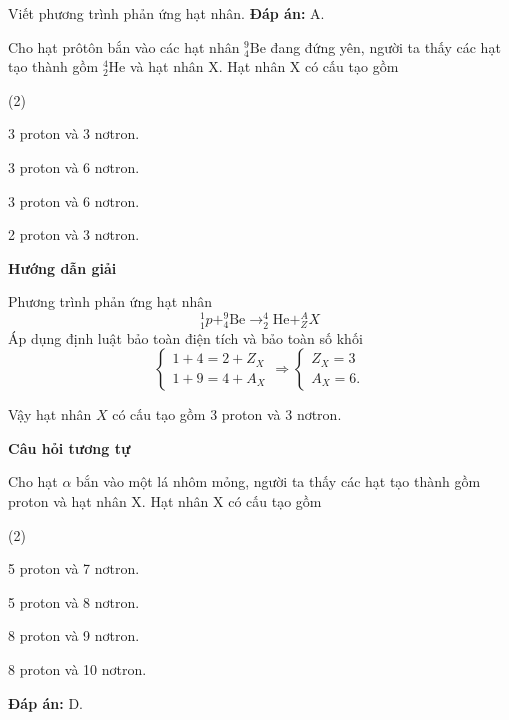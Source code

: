 \begin{dang}{Viết phương trình phản ứng hạt nhân.}
{\textbf{Đáp án:} A.
}
{Cho hạt prôtôn bắn vào các hạt nhân $^9_4\text{Be}$ đang đứng yên, người ta thấy các hạt tạo thành gồm $^4_2\text{He}$ và hạt nhân X. Hạt nhân X có cấu tạo gồm
	\begin{mcq}(2)
		\item 3 proton và 3 nơtron.
		\item 3 proton và 6 nơtron.
		\item 3 proton và 6 nơtron.
		\item 2 proton và 3 nơtron.
	\end{mcq}
}	{\begin{center}
		\textbf{Hướng dẫn giải}
	\end{center}
	Phương trình phản ứng hạt nhân
	\begin{equation*}
	^1_1 p+^9_4\text{Be}\rightarrow ^4_2\text{He}+^A_Z X
	\end{equation*}
	Áp dụng định luật bảo toàn điện tích và bảo toàn số khối
	\begin{equation*}
	\left\{
	\begin{matrix}
	1+4=2+Z_X\\
	1+9=4+A_X
	\end{matrix}
	\right.
	\Rightarrow
	\left\{
	\begin{matrix}
	Z_X=3\\
	A_X=6.
	\end{matrix}
	\right.
	\end{equation*}
	
	Vậy hạt nhân $X$ có cấu tạo gồm 3 proton và 3 nơtron.
	
\begin{center}
	\textbf{Câu hỏi tương tự}
\end{center}
Cho hạt $ \alpha $ bắn vào một lá nhôm mỏng, người ta thấy các hạt tạo thành gồm proton và hạt nhân X. Hạt nhân X có cấu tạo gồm
	\begin{mcq}(2)
		\item 5 proton và 7 nơtron.
		\item 5 proton và 8 nơtron.
		\item 8 proton và 9 nơtron.
		\item 8 proton và 10 nơtron.
	\end{mcq}

	
	\textbf{Đáp án:} D.
}
\end{dang}

